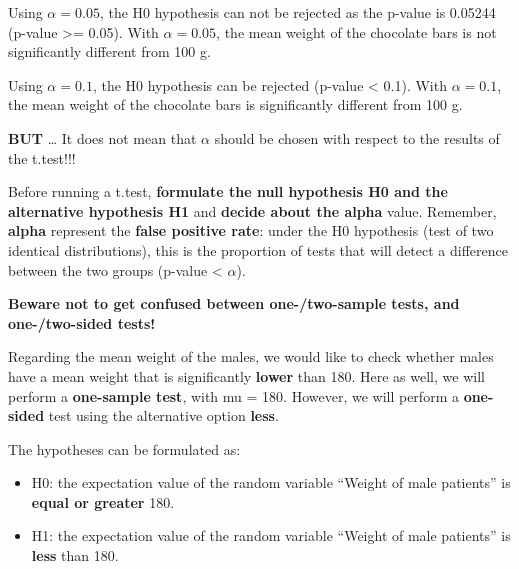 \documentclass[
]{book}
\newenvironment{Shaded}{\begin{snugshade}}{\end{snugshade}}
\newcommand{\AttributeTok}[1]{\textcolor[rgb]{0.13,0.29,0.53}{#1}}
\newcommand{\DecValTok}[1]{\textcolor[rgb]{0.00,0.00,0.81}{#1}}
\newcommand{\FunctionTok}[1]{\textcolor[rgb]{0.13,0.29,0.53}{\textbf{#1}}}
\newcommand{\NormalTok}[1]{#1}
\newcommand{\SpecialCharTok}[1]{\textcolor[rgb]{0.81,0.36,0.00}{\textbf{#1}}}
\newcommand{\StringTok}[1]{\textcolor[rgb]{0.31,0.60,0.02}{#1}}
\begin{document}
Using \(\alpha=0.05\), the H0 hypothesis can not be rejected as the p-value is 0.05244 (p-value \textgreater= 0.05).
With \(\alpha=0.05\), the mean weight of the chocolate bars is not significantly different from 100 g.

Using \(\alpha=0.1\), the H0 hypothesis can be rejected (p-value \textless{} 0.1).
With \(\alpha=0.1\), the mean weight of the chocolate bars is significantly different from 100 g.

\textbf{BUT} \ldots{} It does not mean that \(\alpha\) should be chosen with respect to the results of the t.test!!!

Before running a t.test, \textbf{formulate the null hypothesis H0 and the alternative hypothesis H1} and \textbf{decide about the alpha} value.
Remember, \textbf{alpha} represent the \textbf{false positive rate}: under the H0 hypothesis (test of two identical distributions), this is the proportion of tests that will detect a difference between the two groups (p-value \textless{} \(\alpha\)).

\textbf{Beware not to get confused between one-/two-sample tests, and one-/two-sided tests!}

Regarding the mean weight of the males, we would like to check whether males have a mean weight that is significantly \textbf{lower} than 180.
Here as well, we will perform a \textbf{one-sample test}, with mu = 180.
However, we will perform a \textbf{one-sided} test using the alternative option \textbf{less}.

The hypotheses can be formulated as:

\begin{itemize}
\item
  H0: the expectation value of the random variable ``Weight of male patients'' is \textbf{equal or greater} 180.\\
\item
  H1: the expectation value of the random variable ``Weight of male patients'' is \textbf{less} than 180.
\end{itemize}

\begin{Shaded}
\end{Shaded}
\end{document}
